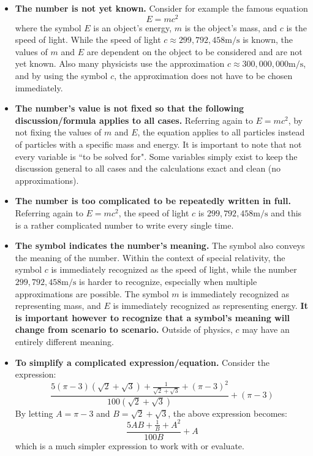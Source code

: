 \documentclass{article}
\begin{document}
\begin{itemize}
\item {\bf The number is not yet known.} 
Consider for example the famous equation 
\[E = mc^2\]
where the symbol \(E\) is an object's energy, \(m\) is the object's mass, and \(c\) is the speed of light. While the speed of light \(c \approx 299,\!792,\!458\text{m/s}\) is known, the values of \(m\) and \(E\) are dependent on the object to be considered and are not yet known. Also many physicists use the approximation \(c \approx 300,\!000,\!000\text{m/s}\), and by using the symbol \(c\), the approximation does not have to be chosen immediately. 
\item {\bf The number's value is not fixed so that the following discussion/formula applies to all cases.}
Referring again to \(E = mc^2\), by not fixing the values of \(m\) and \(E\), the equation applies to all particles instead of particles with a specific mass and energy. It is important to note that not every variable is ``to be solved for". Some variables simply exist to keep the discussion general to all cases and the calculations exact and clean (no approximations).
\item {\bf The number is too complicated to be repeatedly written in full.} 
Referring again to \(E = mc^2\), the speed of light \(c\) is \(299,\!792,\!458\text{m/s}\) and this is a rather complicated number to write every single time. %
\item {\bf The symbol indicates the number's meaning.} 
The symbol also conveys the meaning of the number. Within the context of special relativity, the symbol \(c\) is immediately recognized as the speed of light, while the number \(299,\!792,\!458\text{m/s}\) is harder to recognize, especially when multiple approximations are possible. The symbol \(m\) is immediately recognized as representing mass, and \(E\) is immediately recognized as representing energy. {\bf It is important however to recognize that a symbol's meaning will change from scenario to scenario.} Outside of physics, \(c\) may have an entirely different meaning. 
\item {\bf To simplify a complicated expression/equation.} 
Consider the expression:
\[\frac{5(\pi - 3)(\sqrt{2} + \sqrt{3}) + \frac{1}{\sqrt{2} + \sqrt{3}} + (\pi - 3)^2}{100(\sqrt{2} + \sqrt{3})} + (\pi - 3)\]
By letting \(A = \pi - 3\) and \(B = \sqrt{2} + \sqrt{3}\), the above expression becomes:
\[\frac{5AB + \frac{1}{B} + A^2}{100B} + A\]
which is a much simpler expression to work with or evaluate.
\end{itemize} 
\end{document}
